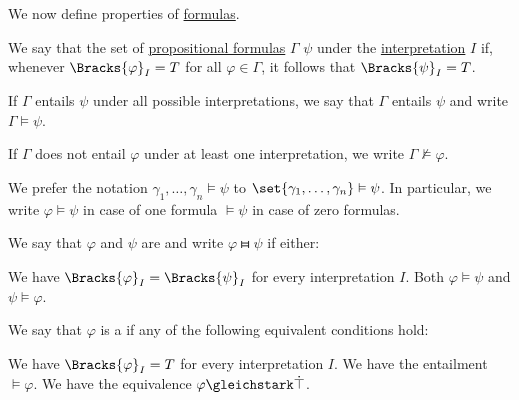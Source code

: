 \begin{definition}\label{def:propositional_semantics}\mimprovised
  We now define  properties of \hyperref[def:propositional_syntax/formula]{formulas}.

  \begin{thmenum}
     We say that the set of \hyperref[def:propositional_syntax/formula]{propositional formulas} \( \Gamma \)  \( \psi \) under the \hyperref[def:propositional_valuation/interpretation]{interpretation} \( I \) if, whenever \( \Bracks{\varphi}_I = T \) for all \( \varphi \in \Gamma \), it follows that \( \Bracks{\psi}_I = T \).

     If \( \Gamma \) entails \( \psi \) under all possible interpretations, we say that \( \Gamma \) entails \( \psi \) and write \( \Gamma \vDash \psi \).

    If \( \Gamma \) does not entail \( \varphi \) under at least one interpretation, we write \( \Gamma \not\vDash \varphi \).

    We prefer the notation \( \gamma_1, \ldots, \gamma_n \vDash \psi \) to \( \set{ \gamma_1, \ldots, \gamma_n } \vDash \psi \). In particular, we write \( \varphi \vDash \psi \) in case of one formula \( \vDash \psi \) in case of zero formulas.

     We say that \( \varphi \) and \( \psi \) are  and write \( \varphi \gleichstark \psi \) if either:
    \begin{thmenum}
       We have \( \Bracks{\varphi}_I = \Bracks{\psi}_I \) for every interpretation \( I \).
       Both \( \varphi \vDash \psi \) and \( \psi \vDash \varphi \).
    \end{thmenum}

     We say that \( \varphi \) is a  if any of the following equivalent conditions hold:
    \begin{thmenum}
       We have \( \Bracks{\varphi}_I = T \) for every interpretation \( I \).
       We have the entailment \( \vDash \varphi \).
       We have the equivalence \( \varphi \gleichstark \syntop \).
    \end{thmenum}


\end{thmenum}
\end{definition}
